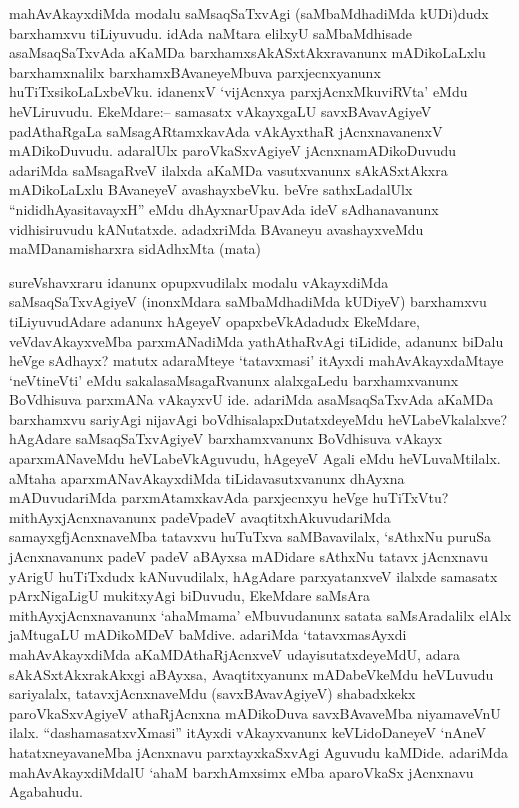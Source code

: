 
\begin{artha}
mahAvAkayxdiMda modalu saMsaqSaTxvAgi (saMbaMdhadiMda kUDi)dudx barxhamxvu tiLiyuvudu. idAda naMtara elilxyU saMbaMdhisade asaMsaqSaTxvAda aKaMDa barxhamxsAkASxtAkxravanunx mADikoLaLxlu barxhamxnalilx barxhamxBAvaneyeMbuva parxjecnxyanunx huTiTxsikoLaLxbeVku. idanenxV `vijAcnxya parxjAcnxMkuviRVta' eMdu heVLiruvudu. EkeMdare:-- samasatx vAkayxgaLU savxBAvavAgiyeV padAthaRgaLa saMsagARtamxkavAda vAkAyxthaR jAcnxnavanenxV mADikoDuvudu. adaralUlx paroVkaSxvAgiyeV jAcnxnamADikoDuvudu adariMda saMsagaRveV ilalxda aKaMDa vasutxvanunx sAkASxtAkxra mADikoLaLxlu BAvaneyeV avashayxbeVku. beVre sathxLadalUlx ``nididhAyasitavayxH'' eMdu dhAyxnarUpavAda ideV sAdhanavanunx vidhisiruvudu kANutatxde. adadxriMda BAvaneyu avashayxveMdu maMDanamisharxra sidAdhxMta (mata)
\end{artha}


\begin{artha}
sureVshavxraru idanunx opupxvudilalx modalu vAkayxdiMda saMsaqSaTxvAgiyeV (inonxMdara saMbaMdhadiMda kUDiyeV) barxhamxvu tiLiyuvudAdare adanunx hAgeyeV opapxbeVkAdadudx EkeMdare, veVdavAkayxveMba parxmANadiMda yathAthaRvAgi tiLidide, adanunx biDalu heVge sAdhayx? matutx adaraMteye `tatavxmasi' itAyxdi mahAvAkayxdaMtaye `neVtineVti' eMdu sakalasaMsagaRvanunx alalxgaLedu barxhamxvanunx BoVdhisuva parxmANa vAkayxvU ide. adariMda asaMsaqSaTxvAda aKaMDa barxhamxvu sariyAgi nijavAgi boVdhisalapxDutatxdeyeMdu heVLabeVkalalxve? hAgAdare saMsaqSaTxvAgiyeV barxhamxvanunx BoVdhisuva vAkayx aparxmANaveMdu heVLabeVkAguvudu, hAgeyeV Agali eMdu heVLuvaMtilalx. aMtaha aparxmANavAkayxdiMda tiLidavasutxvanunx dhAyxna mADuvudariMda parxmAtamxkavAda parxjecnxyu heVge huTiTxVtu? mithAyxjAcnxnavanunx padeVpadeV avaqtitxhAkuvudariMda samayxgfjAcnxnaveMba tatavxvu huTuTxva saMBavavilalx, `sAthxNu puruSa jAcnxnavanunx padeV padeV aBAyxsa mADidare sAthxNu tatavx jAcnxnavu yArigU huTiTxdudx kANuvudilalx, hAgAdare parxyatanxveV ilalxde samasatx pArxNigaLigU mukitxyAgi biDuvudu, EkeMdare saMsAra mithAyxjAcnxnavanunx `ahaMmama' eMbuvudanunx satata saMsAradalilx elAlx jaMtugaLU mADikoMDeV baMdive. adariMda `tatavxmasAyxdi mahAvAkayxdiMda aKaMDAthaRjAcnxveV udayisutatxdeyeMdU, adara sAkASxtAkxrakAkxgi aBAyxsa, Avaqtitxyanunx mADabeVkeMdu heVLuvudu sariyalalx, tatavxjAcnxnaveMdu (savxBAvavAgiyeV) shabadxkekx paroVkaSxvAgiyeV athaRjAcnxna mADikoDuva savxBAvaveMba niyamaveVnU ilalx. ``dashamasatxvXmasi'' itAyxdi vAkayxvanunx keVLidoDaneyeV `nAneV hatatxneyavaneMba jAcnxnavu parxtayxkaSxvAgi Aguvudu kaMDide. adariMda mahAvAkayxdiMdalU `ahaM barxhAmxsimx eMba aparoVkaSx jAcnxnavu Agabahudu. 
\end{artha}

